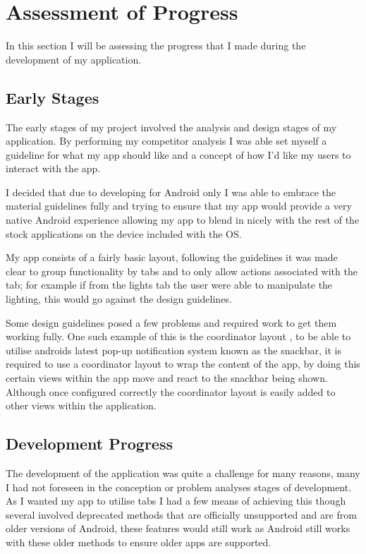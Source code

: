 \section{Assessment of Progress}\label{assessment-of-progress}

In this section I will be assessing the progress that I made during the
development of my application.

\subsection{Early Stages}\label{early-stages}

The early stages of my project involved the analysis and design stages
of my application. By performing my competitor analysis I was able set
myself a guideline for what my app should like and a concept of how I'd
like my users to interact with the app.

I decided that due to developing for Android only I was able to embrace
the material guidelines fully and trying to ensure that my app would
provide a very native Android experience allowing my app to blend in
nicely with the rest of the stock applications on the device included
with the OS.

My app consists of a fairly basic layout, following the guidelines it
was made clear to group functionality by tabs and to only allow actions
associated with the tab; for example if from the lights tab the user
were able to manipulate the lighting, this would go against the design
guidelines.

Some design guidelines posed a few problems and required work to get
them working fully. One such example of this is the coordinator layout
\parencite{coordinator}, to be able to utilise androids latest pop-up
notification system known as the snackbar, it is required to use a
coordinator layout to wrap the content of the app, by doing this certain
views within the app move and react to the snackbar being shown.
Although once configured correctly the coordinator layout is easily
added to other views within the application.

\subsection{Development Progress}\label{development-progress}

The development of the application was quite a challenge for many
reasons, many I had not foreseen in the conception or problem analyses
stages of development. As I wanted my app to utilise tabs I had a few
means of achieving this though several involved deprecated methods that
are officially unsupported and are from older versions of Android, these
features would still work as Android still works with these older
methods to ensure older apps are supported.

